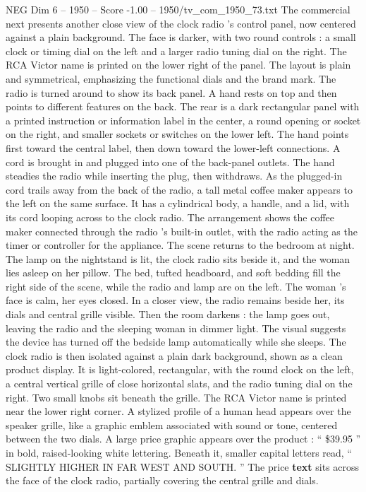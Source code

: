 \begin{textsample}{NEG Dim 6 – 1950 – Score -1.00 – 1950/tv\_com\_1950\_73.txt}
The commercial next presents another close view of the clock radio ’s control panel, now centered against a plain background.
The face is darker, with two round controls : a small clock or timing dial on the left and a larger radio tuning dial on the right.
The RCA Victor name is printed on the lower right of the panel.
The layout is plain and symmetrical, emphasizing the functional dials and the brand mark.
The radio is turned around to show its back panel.
A hand rests on top and then points to different features on the back.
The rear is a dark rectangular panel with a printed instruction or information label in the center, a round opening or socket on the right, and smaller sockets or switches on the lower left.
The hand points first toward the central label, then down toward the lower-left connections.
A cord is brought in and plugged into one of the back-panel outlets.
The hand steadies the radio while inserting the plug, then withdraws.
As the plugged-in cord trails away from the back of the radio, a tall metal coffee maker appears to the left on the same surface.
It has a cylindrical body, a handle, and a lid, with its cord looping across to the clock radio.
The arrangement shows the coffee maker connected through the radio ’s built-in outlet, with the radio acting as the timer or controller for the appliance.
The scene returns to the bedroom at night.
The lamp on the nightstand is lit, the clock radio sits beside it, and the woman lies asleep on her pillow.
The bed, tufted headboard, and soft bedding fill the right side of the scene, while the radio and lamp are on the left.
The woman ’s face is calm, her eyes closed.
In a closer view, the radio remains beside her, its dials and central grille visible.
Then the room darkens : the lamp goes out, leaving the radio and the sleeping woman in dimmer light.
The visual suggests the device has turned off the bedside lamp automatically while she sleeps.
The clock radio is then isolated against a plain dark background, shown as a clean product display.
It is light-colored, rectangular, with the round clock on the left, a central vertical grille of close horizontal slats, and the radio tuning dial on the right.
Two small knobs sit beneath the grille.
The RCA Victor name is printed near the lower right corner.
A stylized profile of a human head appears over the speaker grille, like a graphic emblem associated with sound or tone, centered between the two dials.
A large price graphic appears over the product : “ \$39.95 ” in bold, raised-looking white lettering.
Beneath it, smaller capital letters read, “ SLIGHTLY HIGHER IN FAR WEST AND SOUTH. ” The price \textbf{text} sits across the face of the clock radio, partially covering the central grille and dials.

\end{textsample}
